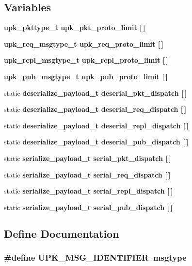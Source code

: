 \subsection*{Variables}
\begin{CompactItemize}
\item 
\bf{upk\_\-pkttype\_\-t} \bf{upk\_\-pkt\_\-proto\_\-limit} [$\,$]
\item 
\bf{upk\_\-req\_\-msgtype\_\-t} \bf{upk\_\-req\_\-proto\_\-limit} [$\,$]
\item 
\bf{upk\_\-repl\_\-msgtype\_\-t} \bf{upk\_\-repl\_\-proto\_\-limit} [$\,$]
\item 
\bf{upk\_\-pub\_\-msgtype\_\-t} \bf{upk\_\-pub\_\-proto\_\-limit} [$\,$]
\item 
static \bf{deserialize\_\-payload\_\-t} \bf{deserial\_\-pkt\_\-dispatch} [$\,$]
\item 
static \bf{deserialize\_\-payload\_\-t} \bf{deserial\_\-req\_\-dispatch} [$\,$]
\item 
static \bf{deserialize\_\-payload\_\-t} \bf{deserial\_\-repl\_\-dispatch} [$\,$]
\item 
static \bf{deserialize\_\-payload\_\-t} \bf{deserial\_\-pub\_\-dispatch} [$\,$]
\item 
static \bf{serialize\_\-payload\_\-t} \bf{serial\_\-pkt\_\-dispatch} [$\,$]
\item 
static \bf{serialize\_\-payload\_\-t} \bf{serial\_\-req\_\-dispatch} [$\,$]
\item 
static \bf{serialize\_\-payload\_\-t} \bf{serial\_\-repl\_\-dispatch} [$\,$]
\item 
static \bf{serialize\_\-payload\_\-t} \bf{serial\_\-pub\_\-dispatch} [$\,$]
\end{CompactItemize}


\subsection{Define Documentation}
\subsubsection{\setlength{\rightskip}{0pt plus 5cm}\#define UPK\_\-MSG\_\-IDENTIFIER~msgtype}\label{upk__v0__protocol__serializer_8c_89bf08a3eb477b5eb78f0d0976cd05a5}



